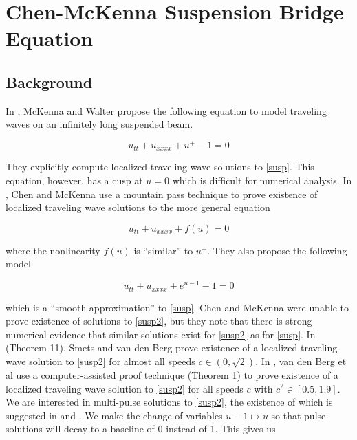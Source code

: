 \documentclass[12pt]{article}
\begin{document}
\section{Chen-McKenna Suspension Bridge Equation}

\subsection{Background}

In \cite{McKenna1990}, McKenna and Walter propose the following equation to model traveling waves on an infinitely long suspended beam.

\begin{equation}\label{susp}
u_{tt} + u_{xxxx} + u^+ - 1 = 0
\end{equation}

They explicitly compute localized traveling wave solutions to \eqref{susp}. This equation, however, has a cusp at $u = 0$ which is difficult for numerical analysis. In \cite{Chen1997}, Chen and McKenna use a mountain pass technique to prove existence of localized traveling wave solutions to the more general equation

\begin{equation}\label{suspgen}
u_{tt} + u_{xxxx} + f(u) = 0
\end{equation}

where the nonlinearity $f(u)$ is ``similar'' to $u^+$. They also propose the following model

\begin{equation}\label{susp2}
u_{tt} + u_{xxxx} + e^{u - 1} - 1 = 0
\end{equation}

which is a ``smooth approximation'' to \eqref{susp}. Chen and McKenna were unable to prove existence of solutions to \eqref{susp2}, but they note that there is strong numerical evidence that similar solutions exist for \eqref{susp2} as for \eqref{susp}. In \cite{Smets2002} (Theorem 11), Smets and van den Berg prove existence of a localized traveling wave solution to \eqref{susp2} for almost all speeds $c \in (0, \sqrt{2})$. In \cite{Berg2018}, van den Berg et al use a computer-assisted proof technique (Theorem 1) to prove existence of a localized traveling wave solution to \eqref{susp2} for all speeds $c$ with $c^2 \in [0.5, 1.9]$.\\

We are interested in multi-pulse solutions to \eqref{susp2}, the existence of which is suggested in \cite{Chen1997} and \cite{Sandstede1997}. We make the change of variables $u - 1 \mapsto u$ so that pulse solutions will decay to a baseline of 0 instead of 1. This gives us
\end{document}

